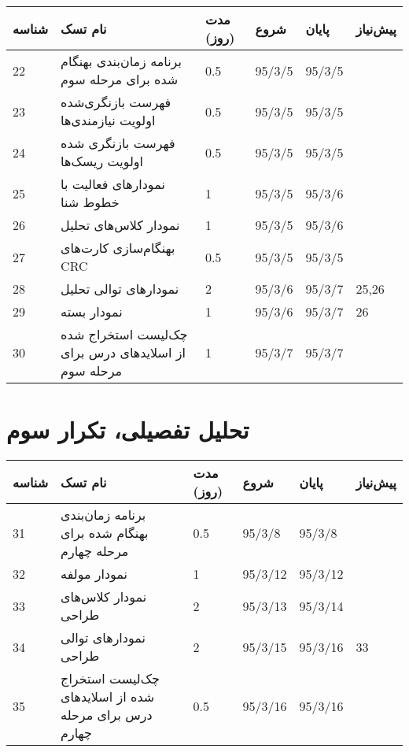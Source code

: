 \begin{tabular}[H]{ | l | l | l | l | l | l | }
	\hline
	شناسه & نام تسک & مدت (روز) & شروع & پایان & پیش‌نیاز    \\ \hline
	22 & برنامه زمان‌بندی  بهنگام شده برای مرحله سوم & 0.5   &   95/3/5 &   95/3/5 &      \\ \hline
	23 &  فهرست بازنگری‌شده اولویت نیازمندی‌ها & 0.5   &   95/3/5 &   95/3/5 &      \\ \hline
	24 &  فهرست بازنگری شده اولویت ریسک‌ها & 0.5   &   95/3/5 &   95/3/5 &      \\ \hline
	25 & نمودارهای فعالیت با خطوط شنا & 1   &   95/3/5 &   95/3/6 &      \\ \hline
	26 & نمودار کلاس‌های تحلیل & 1   &   95/3/5 &   95/3/6 &      \\ \hline
	27 & بهنگام‌سازی کارت‌های CRC & 0.5   &   95/3/5 &   95/3/5 &      \\ \hline
	28 & نمودارهای توالی تحلیل & 2   &   95/3/6 &   95/3/7 & 25,26    \\ \hline
	29 & نمودار بسته & 1   &   95/3/6 &   95/3/7 & 26    \\ \hline
	30 & چک‌‌لیست استخراج شده از اسلایدهای درس برای مرحله سوم & 1   &   95/3/7 &   95/3/7 &   \\ \hline
\end{tabular}

\section{تحلیل تفصیلی، تکرار سوم}	

\begin{tabular}[H]{ | l | l | l | l | l | l | }
	\hline
	شناسه & نام تسک & مدت (روز) & شروع & پایان & پیش‌نیاز    \\ \hline
	31 & برنامه زمان‌بندی بهنگام شده برای مرحله چهارم & 0.5   &   95/3/8 &   95/3/8 &      \\ \hline
	32 & نمودار مولفه & 1 &   95/3/12 &   95/3/12 &      \\ \hline
	33 & نمودار کلاس‌های طراحی & 2   &   95/3/13 &   95/3/14 &      \\ \hline
	34 & نمودارهای توالی طراحی & 2   &   95/3/15 &   95/3/16 &   33   \\ \hline
	35 & چک‌‌لیست استخراج شده از اسلایدهای درس برای مرحله چهارم & 0.5   &   95/3/16 &   95/3/16 &    \\ \hline
\end{tabular}


\newpage

